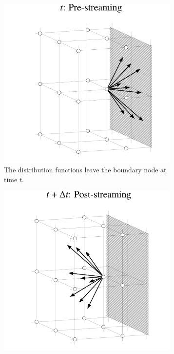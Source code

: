 \begin{figure}[H]
	\centering
	\begin{subfigure}{0.47\textwidth}
		\centering
		\includegraphics[width=0.99\textwidth, trim={0mm 0mm 0mm 0mm}]{figures/symmetric-a.pdf}
		\caption{The distribution functions leave the boundary node at time $t$.}
		\label{fig:sym a}
	\end{subfigure}\hspace{2mm}
	\begin{subfigure}{0.47\textwidth}
			\centering
			\includegraphics[width=0.99\textwidth, trim={0mm 0mm 0mm 0mm}]{figures/symmetric-b.pdf}

\end{subfigure}
\end{figure}
